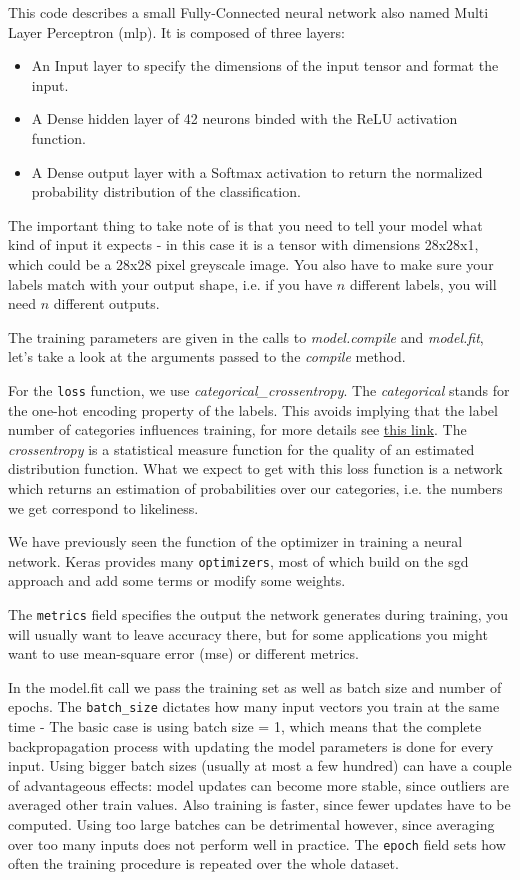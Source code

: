 \documentclass[parskip=half,notes,cadrem,toolver]{iisvlsi}
\begin{document}
This code describes a small Fully-Connected neural network also named Multi Layer Perceptron (\gls{mlp}). It is composed of three layers:

\begin{itemize}
  \item An Input layer to specify the dimensions of the input tensor and format the input.
  \item A Dense hidden layer of 42 neurons binded with the ReLU activation function.
  \item A Dense output layer with a Softmax activation to return the normalized probability distribution of the classification.
\end{itemize}

The important thing to take note of is that you need to tell your model what kind of input it expects - in this case it is a tensor with dimensions 28x28x1, which could be a 28x28 pixel greyscale image. You also have to make sure your labels match with your output shape, i.e. if you have $n$ different labels, you will need $n$ different outputs.

The training parameters are given in the calls to \textit{model.compile} and \textit{model.fit}, let's take a look at the arguments passed to the \textit{compile} method. 

For the \texttt{loss} function, we use \textit{categorical\_crossentropy}. The \textit{categorical} stands for the one-hot encoding property of the labels. This avoids implying that the label number of categories influences training, for more details see \href{https://en.wikipedia.org/wiki/Categorical_variable}{this link}. The \textit{crossentropy} is a statistical measure function for the quality of an estimated distribution function. What we expect to get with this loss function is a network which returns an estimation of probabilities over our categories, i.e. the numbers we get correspond to likeliness.

We have previously seen the function of the optimizer in training a neural network. Keras provides many \texttt{optimizers}, most of which build on the \gls{sgd} approach and add some terms or modify some weights.

The \texttt{metrics} field specifies the output the network generates during training, you will usually want to leave accuracy there, but for some applications you might want to use mean-square error (mse) or different metrics.

In the model.fit call we pass the training set as well as batch size and number of epochs. The \texttt{batch\_size} dictates how many input vectors you train at the same time - The basic case is using batch size = 1, which means that the complete backpropagation process with updating the model parameters is done for every input. Using bigger batch sizes (usually at most a few hundred) can have a couple of advantageous effects: model updates can become more stable, since outliers are averaged other train values. Also training is faster, since fewer updates have to be computed. Using too large batches can be detrimental however, since averaging over too many inputs does not perform well in practice. The \texttt{epoch} field sets how often the training procedure is repeated over the whole dataset.
\end{document}

